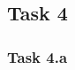 \documentclass{article}
\author{Robin Martens}
\date{19/08/2023}
\begin{document}


\tableofcontents
\clearpage

\setcounter{page}{1}
\pagestyle{fancy}

\subsection*{Task 4}

\subsubsection*{Task 4.a}
\end{document}

